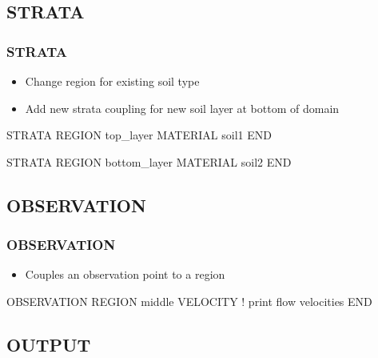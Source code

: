 \documentclass{beamer}
\newcommand\bluecomment[1]{{{\color{blue} #1}}}
\newcommand\magentacomment[1]{{{\color{magenta} #1}}}
\begin{document}
\subsection{STRATA}

\begin{frame}[fragile]\frametitle{STRATA}

\begin{itemize}
\item Change region for existing soil type
\item Add new strata coupling for new soil layer at bottom of domain
\end{itemize}

\begin{semiverbatim}

STRATA
  REGION \magentacomment{top_layer}
  MATERIAL soil1
END

\magentacomment{
STRATA
  REGION bottom_layer
  MATERIAL soil2
END}

\end{semiverbatim}

\end{frame}

\subsection{OBSERVATION}

\begin{frame}[fragile]\frametitle{OBSERVATION}

\begin{itemize}
\item Couples an observation point to a region
\end{itemize}

\begin{semiverbatim}

\magentacomment{
OBSERVATION
  REGION middle
  VELOCITY      \bluecomment{! print flow velocities}
END}

\end{semiverbatim}

\end{frame}

\subsection{OUTPUT}
\end{document}
